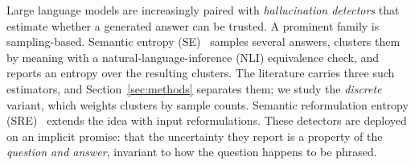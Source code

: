 %
%

Large language models are increasingly paired with \emph{hallucination detectors}
that estimate whether a generated answer can be trusted. A prominent family is
sampling-based. Semantic entropy (SE)~\citep{kuhn2023semantic, farquhar2024detecting}
samples several answers, clusters them by meaning with a natural-language-inference
(NLI) equivalence check, and reports an entropy over the resulting clusters. The literature
carries three such estimators, and Section~\ref{sec:methods} separates them; we study the
\emph{discrete} variant, which weights clusters by sample counts. Semantic reformulation
entropy (SRE)~\citep{tong2025sre} extends the idea with input reformulations. These
detectors are deployed on an implicit promise: that
the uncertainty they report is a property of the \emph{question and answer}, invariant
to how the question happens to be phrased.

